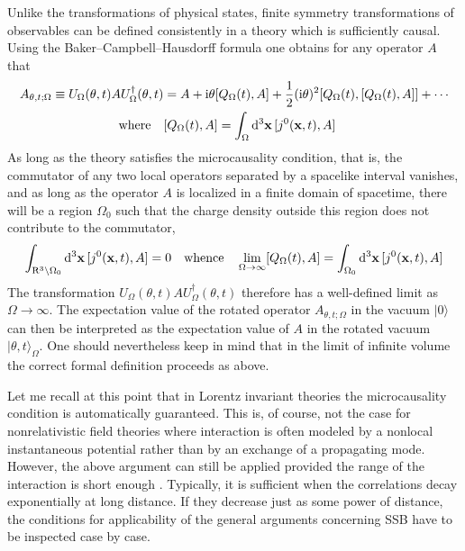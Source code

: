 \documentclass[final,2p,times,12pt,sort&compress]{elsarticle}
\newcommand\gr[1]{\mathrm{#1}}              %
\newcommand\R{\gr{R}}
\newcommand\vek[1]{{\boldsymbol{\bf #1}}}   %
\newcommand\ket[1]{\vert#1\rangle}          %
\newcommand\he[1]{#1^{\dagger}}             %
\newcommand\imag{\mathrm i}                 %
\newcommand\vt{\theta}
\newcommand\dthree{\mathop{{\rm d}^3\!}\nolimits} %
\begin{document}
Unlike the transformations of physical states, finite symmetry transformations
of observables can be defined consistently in a theory which is sufficiently
causal. Using the Baker--Campbell--Hausdorff formula one obtains for any
operator $A$ that
\begin{equation}
\begin{split}
A_{\vt,t;\Omega}\equiv U_\Omega(\vt,t)A\he U_\Omega(\vt,t)&=
A+\imag\vt[Q_\Omega(t),A]+\frac12(\imag\vt)^2[Q_\Omega(t),[Q_\Omega(t),A]]
+\dotsb\\
\text{where}\quad
&[Q_\Omega(t),A]=\int_\Omega\dthree\vek x\,[j^0(\vek x,t),A]
\end{split}
\label{intcharge}
\end{equation}
As long as the theory satisfies the microcausality condition, that is, the
commutator of any two local operators separated by a spacelike interval
vanishes, and as long as the operator $A$ is localized in a finite domain of
spacetime, there will be a region $\Omega_0$ such that the charge density
outside this region does not contribute to the commutator,
\begin{equation}
\int_{\R^3\backslash\Omega_0}\dthree\vek x\,[j^0(\vek x,t),A]=0
\quad\text{whence}\quad
\lim_{\Omega\to\infty}[Q_\Omega(t),A]=\int_{\Omega_0}\dthree\vek x\,
[j^0(\vek x,t),A]
\end{equation}
The transformation $U_\Omega(\vt,t)A\he U_\Omega(\vt,t)$ therefore has a
well-defined limit as $\Omega\to\infty$. The expectation value of the rotated
operator $A_{\vt,t;\Omega}$ in the vacuum $\ket0$ can then be interpreted as the
expectation value of $A$ in the rotated vacuum $\ket{\vt,t}_\Omega$. One should
nevertheless keep in mind that in the limit of infinite volume the correct
formal definition proceeds as above.

Let me recall at this point that in Lorentz invariant theories the
microcausality condition is automatically guaranteed. This is, of course, not
the case for nonrelativistic field theories where interaction is often modeled
by a nonlocal instantaneous potential rather than by an exchange of a
propagating mode. However, the above argument can still be applied provided the
range of the interaction is short enough \cite{Lange:1966zz}. Typically, it is
sufficient when the correlations decay exponentially at long distance. If they
decrease just as some power of distance, the conditions for applicability of the
general arguments concerning SSB have to be inspected case by case.
\end{document}
